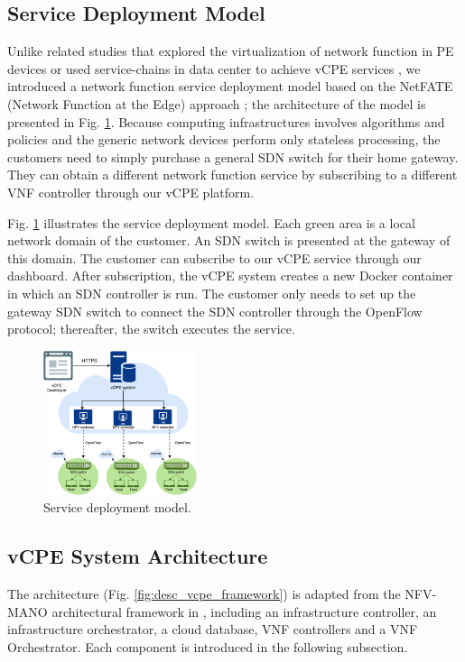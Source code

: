 \documentclass[conference]{IEEEtran}
\begin{document}
\subsection{Service Deployment Model}
Unlike related studies that explored the virtualization of network function in PE devices \cite{vcpe-enhance} or used service-chains in data center to achieve vCPE services \cite{ericcson-vcpe}, we introduced a network function service deployment model based on the NetFATE (Network Function at the Edge) approach \cite{netfate}; the architecture of the model is presented in Fig. \ref{fig:desc_service_deployment}. Because computing infrastructures involves algorithms and policies and the generic network devices perform only stateless processing, the customers need to simply purchase a general SDN switch for their home gateway. They can obtain a different network function service by subscribing to a different VNF controller through our vCPE platform.

Fig. \ref{fig:desc_service_deployment} illustrates the service deployment model. Each green area is a local network domain of the customer. An SDN switch is presented at the gateway of this domain. The customer can subscribe to our vCPE service through our dashboard. After subscription, the vCPE system creates a new Docker container in which an SDN controller is run. The customer only needs to set up the gateway SDN switch to connect the SDN controller through the OpenFlow protocol; thereafter, the switch executes the service.

\begin{figure}[!t]
\centering
\includegraphics[width=0.4\textwidth]{./figures/desc_service_deployment}
\caption{Service deployment model.}
\label{fig:desc_service_deployment}
\end{figure}



\subsection{vCPE System Architecture}
The architecture (Fig. \ref{fig:desc_vcpe_framework}) is adapted from the NFV-MANO architectural framework in \cite{etsi-nfv-mano}, including an infrastructure controller, an infrastructure orchestrator, a cloud database, VNF controllers and a VNF Orchestrator. Each component is introduced in the following subsection.
\end{document}
